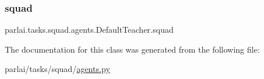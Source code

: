 \subsubsection{\texorpdfstring{squad}{squad}}
{\footnotesize\ttfamily parlai.\+tasks.\+squad.\+agents.\+Default\+Teacher.\+squad}



The documentation for this class was generated from the following file\+:\begin{DoxyCompactItemize}
\item 
parlai/tasks/squad/\hyperlink{parlai_2tasks_2squad_2agents_8py}{agents.\+py}\end{DoxyCompactItemize}
